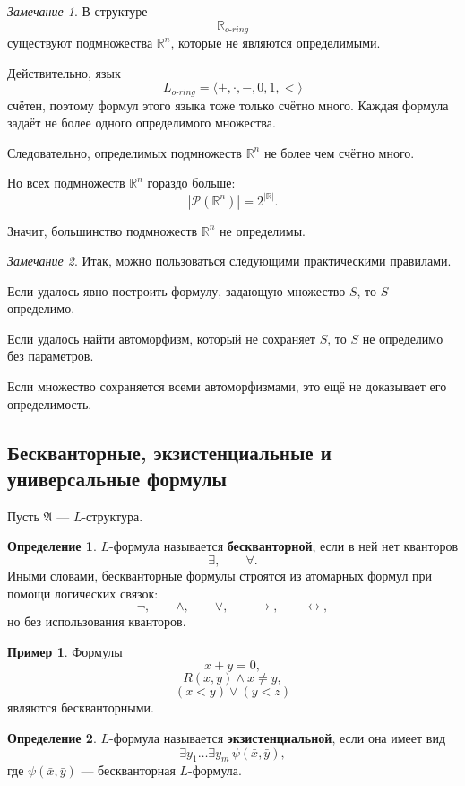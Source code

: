 \documentclass[12pt,a4paper,oneside,openany]{book}
\theoremstyle{definition}
\newtheorem{definition}{Определение}[chapter]
\newtheorem{example}{Пример}[chapter]
\theoremstyle{plain}
\theoremstyle{remark}
\newtheorem{remark}{Замечание}[chapter]
\begin{document}
\begin{remark}
В структуре
\[
\mathbb R_{o\text{-}ring}
\]
существуют подмножества $\mathbb R^n$, которые не являются определимыми.

Действительно, язык
\[
L_{o\text{-}ring}
=
\langle +,\cdot,-,0,1,<\rangle
\]
счётен, поэтому формул этого языка тоже только счётно много. Каждая формула задаёт не более одного определимого множества.

Следовательно, определимых подмножеств $\mathbb R^n$ не более чем счётно много.

Но всех подмножеств $\mathbb R^n$ гораздо больше:
\[
|\mathcal P(\mathbb R^n)|=2^{|\mathbb R|}.
\]

Значит, большинство подмножеств $\mathbb R^n$ не определимы.
\end{remark}

\begin{remark}
Итак, можно пользоваться следующими практическими правилами.

Если удалось явно построить формулу, задающую множество $S$, то $S$ определимо.

Если удалось найти автоморфизм, который не сохраняет $S$, то $S$ не определимо без параметров.

Если множество сохраняется всеми автоморфизмами, это ещё не доказывает его определимость.
\end{remark}


\subsection{Бескванторные, экзистенциальные и универсальные формулы}

Пусть $\mathfrak A$ — $L$-структура.

\begin{definition}
$L$-формула называется \textbf{бескванторной}, если в ней нет кванторов
\[
\exists,\qquad \forall.
\]
Иными словами, бескванторные формулы строятся из атомарных формул при помощи логических связок:
\[
\neg,\qquad \wedge,\qquad \vee,\qquad \to,\qquad \leftrightarrow,
\]
но без использования кванторов.
\end{definition}

\begin{example}
Формулы
\[
x+y=0,
\]
\[
R(x,y)\wedge x\ne y,
\]
\[
(x<y)\vee(y<z)
\]
являются бескванторными.
\end{example}

\begin{definition}
$L$-формула называется \textbf{экзистенциальной}, если она имеет вид
\[
\exists y_1\ldots \exists y_m\,\psi(\bar x,\bar y),
\]
где $\psi(\bar x,\bar y)$ — бескванторная $L$-формула.
\end{definition}
\end{document}
